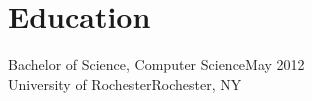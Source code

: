 \section{Education}

  Bachelor of Science, Computer Science\hfill May 2012\\
  University of Rochester\hfill Rochester, NY\\

